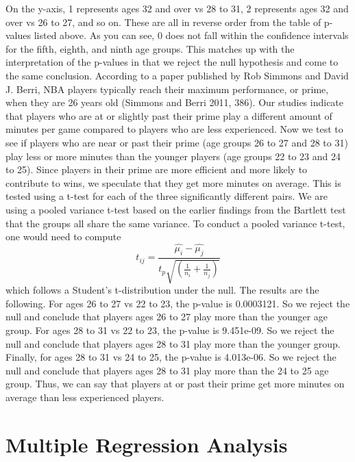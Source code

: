 \documentclass{article}
\begin{document}
\newpage
On the y-axis, 1 represents ages 32 and over vs 28 to 31, 2 represents ages 32 and over vs 26 to 27, and so on. These are all in reverse order from the table of p-values listed above. As you can see, 0 does not fall within the confidence intervals for the fifth, eighth, and ninth age groups. This matches up with the interpretation of the p-values in that we reject the null hypothesis and come to the same conclusion. According to a paper published by Rob Simmons and David J. Berri, NBA players typically reach their maximum performance, or prime, when they are 26 years old (Simmons and Berri 2011, 386). Our studies indicate that players who are at or slightly past their prime play a different amount of minutes per game compared to players who are less experienced. Now we test to see if players who are near or past their prime (age groups 26 to 27 and 28 to 31) play less or more minutes than the younger players (age groups 22 to 23 and 24 to 25). Since players in their prime are more efficient and more likely to contribute to wins, we speculate that they get more minutes on average. This is tested using a t-test for each of the three significantly different pairs. We are using a pooled variance t-test based on the earlier findings from the Bartlett test that the groups all share the same variance. To conduct a pooled variance t-test, one would need to compute $$t_{ij}=\frac{\widehat{\mu_i}-\widehat{\mu_j}}{{t_p}\sqrt{(\frac{1}{n_i}+\frac{1}{n_j})}}$$which follows a Student’s t-distribution under the null. The results are the following. For ages 26 to 27 vs 22 to 23, the p-value is 0.0003121. So we reject the null and conclude that players ages 26 to 27 play more than the younger age group. For ages 28 to 31 vs 22 to 23, the p-value is 9.451e-09. So we reject the null and conclude that players ages 28 to 31 play more than the younger group. Finally, for ages 28 to 31 vs 24 to 25, the p-value is 4.013e-06. So we reject the null and conclude that players ages 28 to 31 play more than the 24 to 25 age group. Thus, we can say that players at or past their prime get more minutes on average than less experienced players.



\section*{Multiple Regression Analysis}
\end{document}
